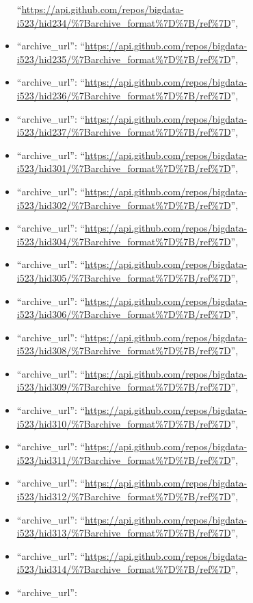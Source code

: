 \begin{itemize}
  ``\url{https://api.github.com/repos/bigdata-i523/hid234/\%7Barchive_format\%7D\%7B/ref\%7D}'',
\item
  ``archive\_url'':
  ``\url{https://api.github.com/repos/bigdata-i523/hid235/\%7Barchive_format\%7D\%7B/ref\%7D}'',
\item
  ``archive\_url'':
  ``\url{https://api.github.com/repos/bigdata-i523/hid236/\%7Barchive_format\%7D\%7B/ref\%7D}'',
\item
  ``archive\_url'':
  ``\url{https://api.github.com/repos/bigdata-i523/hid237/\%7Barchive_format\%7D\%7B/ref\%7D}'',
\item
  ``archive\_url'':
  ``\url{https://api.github.com/repos/bigdata-i523/hid301/\%7Barchive_format\%7D\%7B/ref\%7D}'',
\item
  ``archive\_url'':
  ``\url{https://api.github.com/repos/bigdata-i523/hid302/\%7Barchive_format\%7D\%7B/ref\%7D}'',
\item
  ``archive\_url'':
  ``\url{https://api.github.com/repos/bigdata-i523/hid304/\%7Barchive_format\%7D\%7B/ref\%7D}'',
\item
  ``archive\_url'':
  ``\url{https://api.github.com/repos/bigdata-i523/hid305/\%7Barchive_format\%7D\%7B/ref\%7D}'',
\item
  ``archive\_url'':
  ``\url{https://api.github.com/repos/bigdata-i523/hid306/\%7Barchive_format\%7D\%7B/ref\%7D}'',
\item
  ``archive\_url'':
  ``\url{https://api.github.com/repos/bigdata-i523/hid308/\%7Barchive_format\%7D\%7B/ref\%7D}'',
\item
  ``archive\_url'':
  ``\url{https://api.github.com/repos/bigdata-i523/hid309/\%7Barchive_format\%7D\%7B/ref\%7D}'',
\item
  ``archive\_url'':
  ``\url{https://api.github.com/repos/bigdata-i523/hid310/\%7Barchive_format\%7D\%7B/ref\%7D}'',
\item
  ``archive\_url'':
  ``\url{https://api.github.com/repos/bigdata-i523/hid311/\%7Barchive_format\%7D\%7B/ref\%7D}'',
\item
  ``archive\_url'':
  ``\url{https://api.github.com/repos/bigdata-i523/hid312/\%7Barchive_format\%7D\%7B/ref\%7D}'',
\item
  ``archive\_url'':
  ``\url{https://api.github.com/repos/bigdata-i523/hid313/\%7Barchive_format\%7D\%7B/ref\%7D}'',
\item
  ``archive\_url'':
  ``\url{https://api.github.com/repos/bigdata-i523/hid314/\%7Barchive_format\%7D\%7B/ref\%7D}'',
\item
  ``archive\_url'':

\end{itemize}
